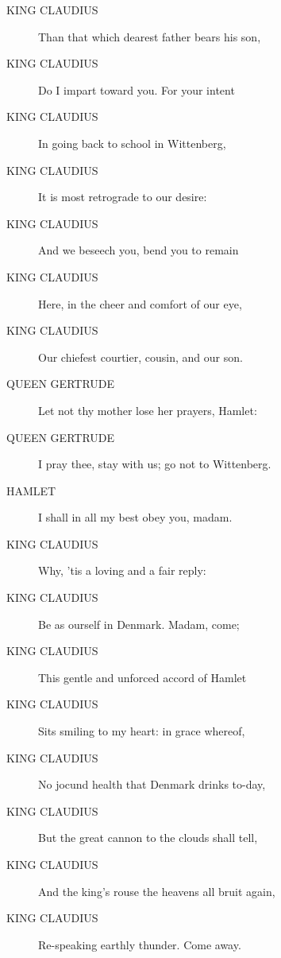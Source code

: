 \documentclass{article}
\begin{document}
\begin{description}
\item[KING CLAUDIUS] Than that which dearest father bears his son,
\item[KING CLAUDIUS] Do I impart toward you. For your intent
\item[KING CLAUDIUS] In going back to school in Wittenberg,
\item[KING CLAUDIUS] It is most retrograde to our desire:
\item[KING CLAUDIUS] And we beseech you, bend you to remain
\item[KING CLAUDIUS] Here, in the cheer and comfort of our eye,
\item[KING CLAUDIUS] Our chiefest courtier, cousin, and our son.
\end{description}
          
\begin{description}
            
\item[QUEEN GERTRUDE] Let not thy mother lose her prayers, Hamlet:
\item[QUEEN GERTRUDE] I pray thee, stay with us; go not to Wittenberg.
\end{description}
          
\begin{description}
            
\item[HAMLET] I shall in all my best obey you, madam.
\end{description}
          
\begin{description}
            
\item[KING CLAUDIUS] Why, 'tis a loving and a fair reply:
\item[KING CLAUDIUS] Be as ourself in Denmark. Madam, come;
\item[KING CLAUDIUS] This gentle and unforced accord of Hamlet
\item[KING CLAUDIUS] Sits smiling to my heart: in grace whereof,
\item[KING CLAUDIUS] No jocund health that Denmark drinks to-day,
\item[KING CLAUDIUS] But the great cannon to the clouds shall tell,
\item[KING CLAUDIUS] And the king's rouse the heavens all bruit again,
\item[KING CLAUDIUS] Re-speaking earthly thunder. Come away.
\end{description}
          
\end{document}
